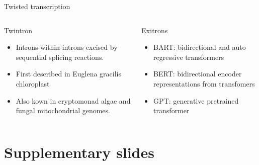 \documentclass[10pt]{beamer}
\begin{document}
\begin{frame}{Twisted transcription}
\begin{columns}[T,onlytextwidth]
	
	\begin{alertblock}{Twintron}
		\begin{itemize}
			\item Introns-within-introns excised by sequential splicing reactions. 
			\item First described in Euglena gracilis chloroplast
			\item Also kown in cryptomonad algae and fungal mitochondrial genomes.
		\end{itemize}
	\end{alertblock}

		
	\begin{alertblock}{Exitrons}
		\begin{itemize}
			\item BART: bidirectional and auto regressive transformers
			\item BERT: bidirectional encoder representations from transfomers
			\item GPT: generative pretrained transformer
		\end{itemize}

	\end{alertblock}
\end{columns}
\end{frame}





\appendix

\section{Supplementary slides}
\end{document}
